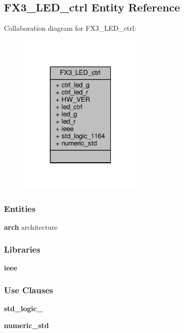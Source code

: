 \subsection{F\+X3\+\_\+\+L\+E\+D\+\_\+ctrl Entity Reference}
\label{classFX3__LED__ctrl}


Collaboration diagram for F\+X3\+\_\+\+L\+E\+D\+\_\+ctrl\+:\nopagebreak
\begin{figure}[H]
\begin{center}
\leavevmode
\includegraphics[width=171pt]{d9/de7/classFX3__LED__ctrl__coll__graph}
\end{center}
\end{figure}
\subsubsection*{Entities}
\begin{DoxyCompactItemize}
\item 
{\bf arch} architecture
\end{DoxyCompactItemize}
\subsubsection*{Libraries}
 \begin{DoxyCompactItemize}
\item 
{\bf ieee} 
\end{DoxyCompactItemize}
\subsubsection*{Use Clauses}
 \begin{DoxyCompactItemize}
\item 
{\bf std\+\_\+logic\+\_}   
\item 
{\bf numeric\+\_\+std}   
\end{DoxyCompactItemize}
